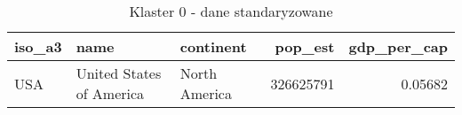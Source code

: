 \begin{table}[h!]
    \centering
    \caption{Klaster 0 - dane standaryzowane}
    \label{tab:cl0std}
    \begin{tabular}{lllrr}
        \toprule
        iso\_a3 & name                     & continent     & pop\_est  & gdp\_per\_cap \\
        \midrule
        USA     & United States of America & North America & 326625791 & 0.05682       \\
        \bottomrule
    \end{tabular}
\end{table}
